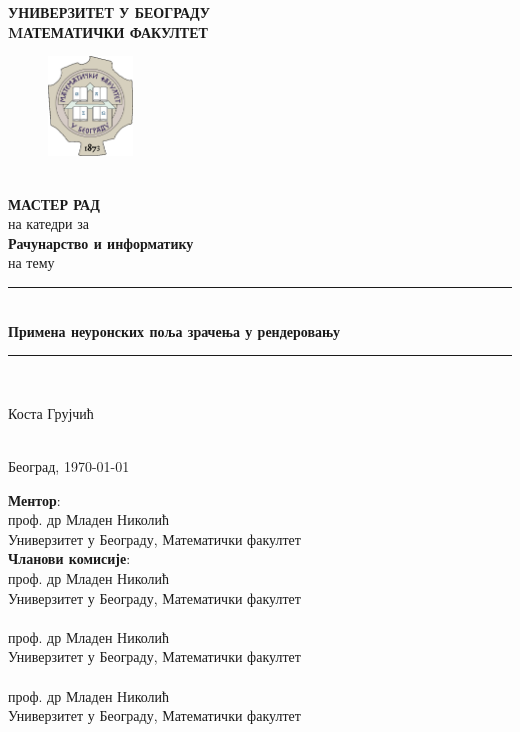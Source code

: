 \documentclass[12pt, a4paper]{article}
\begin{document}
\begin{titlepage}
	\newcommand{\HRule}{\rule{\linewidth}{0.5mm}}
	\center
	
	\textbf{\LARGE УНИВЕРЗИТЕТ У БЕОГРАДУ\\MАТЕМАТИЧКИ ФАКУЛТЕТ}
	\begin{figure}[!ht]
		\centering
		\includegraphics[width=0.2\textwidth]{img/matf-logo.png}
	\end{figure}\\[3cm]
	\textbf{\Large МАСТЕР РАД}\\[0.3cm]
	на катедри за \\[0.3cm]
	\textbf{\Large Рачунарство и информатику}\\[.7cm] %
	на тему\\[0.7cm]
	
	\HRule \\[0.4cm]
	{ \huge \bfseries Примена неуронских поља зрачења у рендеровању}\\[0.4cm] %
	\HRule \\[1.5cm]
	
	\begin{minipage}{0.4\textwidth}
		\begin{center}
			Коста Грујчић
		\end{center}
	\end{minipage}\\[5cm]
	
	{\large Београд, \today}\\[2.5cm]
	\vfill
\end{titlepage}

\newpage
\thispagestyle{empty}

\hspace{0pt}
\vfill
\noindent \textbf{Ментор}:\\
проф. др Младен Николић\\Универзитет у Београду, Математички факултет
\\[2cm]

\noindent \textbf{Чланови комисије}:
\\проф. др Младен Николић\\Универзитет у Београду, Математички факултет
\\[0.25cm]
\\проф. др Младен Николић\\Универзитет у Београду, Математички факултет
\\[0.25cm]
\\проф. др Младен Николић\\Универзитет у Београду, Математички факултет
\\[2cm]
\end{document}
